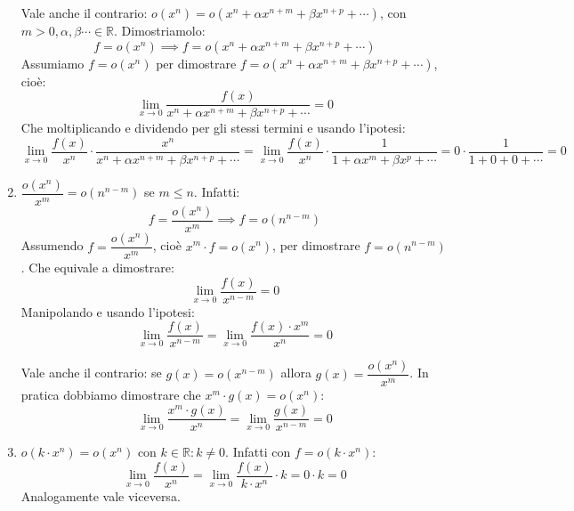 \begin{enumerate}
		Vale anche il contrario: $o(x^n) = o(x^n + \alpha x^{n+m} + \beta x^{n + p} + \cdots)$, con $m > 0, \alpha, \beta \cdots \in \mathbb{R}$. Dimostriamolo:
		\begin{equation*}
			f = o(x^n) \implies f = o(x^n + \alpha x^{n+m} + \beta x^{n + p} + \cdots)
		\end{equation*}
		Assumiamo $f = o(x^n)$ per dimostrare $f = o(x^n + \alpha x^{n+m} + \beta x^{n + p} + \cdots)$, cioè:
		\begin{equation*}
			\lim_{x \to 0} \dfrac{f(x)}{x^n + \alpha x^{n+m} + \beta x^{n + p} + \cdots} = 0
		\end{equation*}
		Che moltiplicando e dividendo per gli stessi termini e usando l'ipotesi:
		\begin{equation*}
			\lim_{x \to 0} \dfrac{f(x)}{x^n} \cdot \dfrac{x^n}{x^n + \alpha x^{n+m} + \beta x^{n + p} + \cdots} = \lim_{x \to 0} \dfrac{f(x)}{x^n} \cdot \dfrac{1}{1 + \alpha x^{m} + \beta x^{p} + \cdots} = 0 \cdot \dfrac{1}{1 + 0 + 0 + \cdots} = 0
		\end{equation*}

	\item $\dfrac{o(x^n)}{x^m} = o(n^{n-m})$ se $m \leq n$. Infatti:
		\begin{equation*}
			f = \dfrac{o(x^n)}{x^m} \implies f = o(n^{n-m})
		\end{equation*}
		Assumendo $f = \dfrac{o(x^n)}{x^m}$, cioè $x^m \cdot f = o(x^n)$, per dimostrare $f = o(n^{n-m})$. Che equivale a dimostrare:
		\begin{equation*}
			\lim_{x \to 0} \dfrac{f(x)}{x^{n-m}} = 0
		\end{equation*}
		Manipolando e usando l'ipotesi:
		\begin{equation*}
			\lim_{x \to 0} \dfrac{f(x)}{x^{n-m}} = \lim_{x \to 0} \dfrac{f(x) \cdot x^m}{x^n} = 0
		\end{equation*}

		Vale anche il contrario: se $g(x) = o(x^{n-m})$ allora $g(x) = \dfrac{o(x^n)}{x^m}$. In pratica dobbiamo dimostrare che $x^m \cdot g(x) = o(x^n)$:
		\begin{equation*}
			\lim_{x \to 0} \dfrac {x^m \cdot g(x)}{x^n} = \lim_{x \to 0} \dfrac{g(x)}{x^{n-m}} = 0
		\end{equation*}

	\item $o(k \cdot x^n) = o(x^n)$ con $k \in \mathbb{R}: k \neq 0$. Infatti con $f=o(k\cdot x^n)$:
		\begin{equation*}
			\lim_{x \to 0} \dfrac{f(x)}{x^n} = \lim_{x \to 0} \dfrac{f(x)}{k \cdot x^n} \cdot k = 0 \cdot k = 0
		\end{equation*}
		Analogamente vale viceversa.


\end{enumerate}
